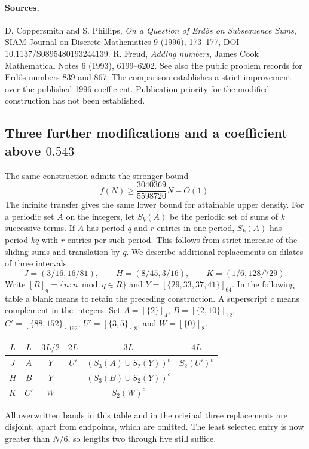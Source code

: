 \documentclass[11pt]{article}
\begin{document}
\paragraph{Sources.}
D. Coppersmith and S. Phillips, \emph{On a Question of Erd\H{o}s on Subsequence Sums}, SIAM Journal on Discrete Mathematics 9 (1996), 173--177, DOI 10.1137/S0895480193244139.
R. Freud, \emph{Adding numbers}, James Cook Mathematical Notes 6 (1993), 6199--6202. See also the public problem records for Erd\H{o}s numbers 839 and 867. The comparison establishes a strict improvement over the published 1996 coefficient. Publication priority for the modified construction has not been established.



\subsection{Three further modifications and a coefficient above \(0.543\)}
The same construction admits the stronger bound
\[
f(N)\ge \frac{3040369}{5598720}N-O(1).
\]
The infinite transfer gives the same lower bound for attainable upper density. For a periodic set $A$ on the integers, let $S_k(A)$ be the periodic set of sums of $k$ successive terms. If $A$ has period $q$ and $r$ entries in one period, $S_k(A)$ has period $kq$ with $r$ entries per such period. This follows from strict increase of the sliding sums and translation by $q$. We describe additional replacements on dilates of three intervals.
\[
J=(3/16,16/81),\qquad H=(8/45,3/16),\qquad K=(1/6,128/729).
\]
Write $[R]_q=\{n:n\bmod q\in R\}$ and $Y=[\{29,33,37,41\}]_{64}$. In the following table a blank means to retain the preceding construction. A superscript $c$ means complement in the integers. Set $A=[\{2\}]_4$, $B=[\{2,10\}]_{12}$, $C'=[\{88,152\}]_{192}$, $U'=[\{3,5\}]_8$, and $W=[\{0\}]_8$.
\begin{center}\small
\begin{tabular}{c|ccccc}
$L$ & $L$ & $3L/2$ & $2L$ & $3L$ & $4L$\\ \hline
$J$&$A$&$Y$&$U'$&$(S_3(A)\cup S_2(Y))^c$&$S_2(U')^c$\\
$H$&$B$&$Y$&&$(S_3(B)\cup S_2(Y))^c$&\\
$K$&$C'$&$W$&&$S_2(W)^c$&
\end{tabular}\end{center}
All overwritten bands in this table and in the original three replacements are disjoint, apart from endpoints, which are omitted. The least selected entry is now greater than $N/6$, so lengths two through five still suffice.
\end{document}
